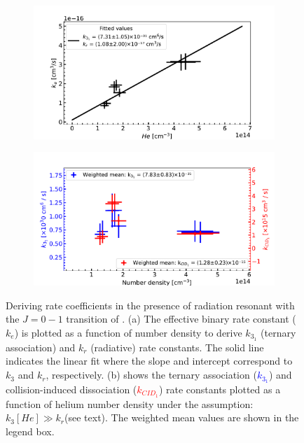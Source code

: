 \begin{figure}[!htb]
    \centering
    \begin{subfigure}[b]{0.49\textwidth}
        \centering
        \includegraphics[width=1\textwidth]{figures/measurements/kinetics/functionOf_nHe/on_4.8K_k31_effective_rate_constants.pdf}
        \caption{}
        \label{fig:on:effective-rate-constants}
    \end{subfigure}
    \hfill
    \begin{subfigure}[b]{0.49\textwidth}
        \centering
        \includegraphics[width=1\textwidth]{figures/measurements/kinetics/functionOf_nHe/on_4.8K_k3_kCID_1_as_functionOfnHe.pdf}
        \caption{}
        \label{fig:on:rate-constants}
    \end{subfigure}

    \caption{Deriving rate coefficients in the presence of radiation resonant with the $J=0-1$ transition of \CD. (a) The effective binary rate constant ($k_e$) is plotted as a function of number density to derive $k_{3_1}$ (ternary association) and $k_r$ (radiative) rate constants. The solid line indicates the linear fit where the slope and intercept correspond to $k_3$ and $k_r$, respectively. (b) shows the ternary association (\textcolor{blue}{$k_{3_1}$}) and collision-induced dissociation (\textcolor{red}{$k_{CID_1}$}) rate constants plotted as a function of helium number density under the assumption: $k_3[He] \gg k_r$(see text). The weighted mean values are shown in the legend box.}
    \label{fig:on:effective-and-ternary}

\end{figure}

